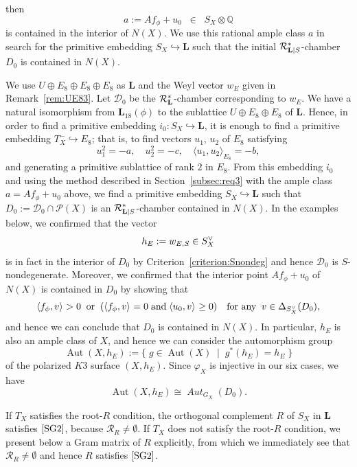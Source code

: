 \documentclass{amsart}
\theoremstyle{plain}
\theoremstyle{definition}
\theoremstyle{remark}
\numberwithin{equation}{section}
\numberwithin{table}{section}
\numberwithin{figure}{section}
\newcommand{\Q}{\mathord{\mathbb  Q}}
\newcommand{\DDD}{\mathord{\mathcal D}}
\newcommand{\PPP}{\mathord{\mathcal P}}
\newcommand{\RRR}{\mathord{\mathcal R}}
\newcommand{\inj}{\hookrightarrow}
\newcommand{\isom}{\mathbin{\,\raise -.6pt\rlap{$\to$}\raise 3.5pt \hbox{\hskip .3pt$\mathord{\sim}$}\;}}
\newcommand{\set}[2]{\{\; {#1} \; \mid \; {#2} \;  \}}
\newcommand{\tensor}{\otimes}
\newcommand{\dual}{\sp{\vee}}
\newcommand{\OG}{\mathord{\mathrm {O}}}
\newcommand{\Aut}{\operatorname{\mathrm {Aut}}\nolimits}
\renewcommand{\L}{\mathord{\mathbf{L}}}
\newcommand{\intM}[2]{\langle{#1}\rangle_{#2}}
\newcommand{\aut}{\operatorname{\mathit {Aut}}\nolimits}
\newcommand{\Roots}{\RRR}
\newcommand{\sphyp}{\sp*}
\newcommand{\RtsLS}{\Roots_{\L|S}}
\newcommand{\Nc}{N}
\newcommand{\assumptwo}{\mathord{\rm [SG2]}}
\newcommand{\assumpthree}{\mathord{\rm [SG3]}}
\begin{document}
then 
$$
a:=A f_{\phi}+u_0\;\;\in\;\; S_X\tensor\Q
$$
is contained in the interior of $\Nc(X)$.
We use this rational ample class $a$ in search for the primitive embedding $S_X\inj \L$
such that the initial $\RtsLS\sphyp$-chamber $D_0$ is contained in $N(X)$.
%
\par
%
We use $U\oplus E_8\oplus E_8\oplus E_8$ as $\L$
and the Weyl vector $w_E$ given in Remark~\ref{rem:UE83}.
Let $\DDD_0$ be the $\Roots_{\L}\sphyp$-chamber corresponding to $w_E$.
We have a natural isomorphism from $\L_{18}(\phi)$ to the sublattice $U\oplus E_8\oplus E_8$
of $\L$.
Hence, in order to find a primitive embedding $i_0\colon S_X\inj \L$,
it is enough to find a primitive embedding 
$T_X^{-}\inj E_8$;
that is, to find vectors $u_1$, $u_2$ of $E_8$ satisfying
$$
u_1^2=-a,\quad u_2^2=-c, \quad \intM{u_1, u_2}{E_8}=-b, 
$$
and generating 
a  primitive sublattice of rank $2$ in $E_8$.
From this embedding $i_0$ and using the method described in Section~\ref{subsec:req3}
with the ample class $a=Af_{\phi}+u_0$ above,
we find a primitive embedding $S_X\inj \L$ 
such that
$D_0:=\DDD_0\cap \PPP(X)$ is an $\RtsLS\sphyp$-chamber contained in $\Nc(X)$.
In the examples below,
we  confirmed that the vector
$$
h_E:=w_{E, S}\in S_X\dual
$$
is in fact in the interior of $D_0$ by Criterion~\ref{criterion:Snondeg}
and hence $\DDD_0$ is $S$-nondegenerate.
Moreover,
we confirmed 
that the interior point  $Af_{\phi}+u_0$  of $N(X)$ is contained in $D_0$
by showing
that
$$
\intM{f_{\phi}, v}{}>0\;\;\textrm{or} \;\; (\intM{f_{\phi}, v}{}=0\;\textrm{and}\; \intM{u_0, v}{}\ge 0)\quad 
\textrm{for any}\;\; v\in \Delta_{S_X\dual} (D_0), 
$$
and hence we can conclude that $D_0$ is contained in $N(X)$.
In particular, $h_E$ is also an ample class of $X$,
and hence we can consider the automorphism group
$$
\Aut(X, h_E):=\set{g\in \Aut(X)}{g^*(h_E)=h_E}
$$
of the polarized $K3$ surface $(X, h_E)$.
Since $\varphi_X$ is injective in our six cases,
we have 
$$
\Aut(X, h_E)\cong \aut_{G_X}(D_0).
$$
%
\par
%
If $T_X$ satisfies the root-$R$ condition,
the orthogonal complement $R$ of $S_X$ in $\L$ satisfies $\assumptwo$,
because $\Roots_R\ne \emptyset$.
If $T_X$ does not satisfy the root-$R$ condition,
we present below a Gram matrix of $R$ explicitly,
from which  
we immediately see that $\Roots_R\ne \emptyset$  and hence $R$ satisfies  $\assumptwo$.
%
\end{document}
